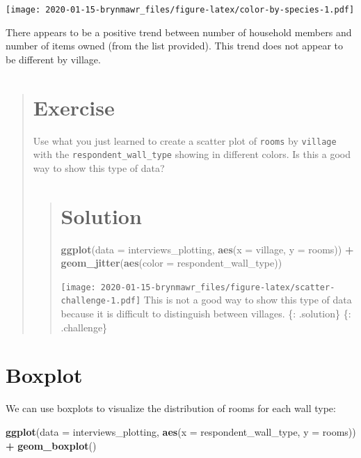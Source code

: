 \documentclass[]{book}
\newenvironment{Shaded}{\begin{snugshade}}{\end{snugshade}}
\newcommand{\KeywordTok}[1]{\textcolor[rgb]{0.13,0.29,0.53}{\textbf{#1}}}
\newcommand{\DataTypeTok}[1]{\textcolor[rgb]{0.13,0.29,0.53}{#1}}
\newcommand{\StringTok}[1]{\textcolor[rgb]{0.31,0.60,0.02}{#1}}
\newcommand{\OperatorTok}[1]{\textcolor[rgb]{0.81,0.36,0.00}{\textbf{#1}}}
\newcommand{\NormalTok}[1]{#1}
\begin{document}
\texttt{[image: 2020-01-15-brynmawr\_files/figure-latex/color-by-species-1.pdf]}

There appears to be a positive trend between number of household members
and number of items owned (from the list provided). This trend does not
appear to be different by village.

\begin{quote}
\section{Exercise}\label{exercise-12}

Use what you just learned to create a scatter plot of \texttt{rooms} by
\texttt{village} with the \texttt{respondent\_wall\_type} showing in
different colors. Is this a good way to show this type of data?

\begin{quote}
\section{Solution}\label{solution-16}

\begin{Shaded}
\begin{Highlighting}[]
\KeywordTok{ggplot}\NormalTok{(}\DataTypeTok{data =}\NormalTok{ interviews_plotting, }\KeywordTok{aes}\NormalTok{(}\DataTypeTok{x =}\NormalTok{ village, }\DataTypeTok{y =}\NormalTok{ rooms)) }\OperatorTok{+}
\KeywordTok{geom_jitter}\NormalTok{(}\KeywordTok{aes}\NormalTok{(}\DataTypeTok{color =}\NormalTok{ respondent_wall_type))}
\end{Highlighting}
\end{Shaded}

\texttt{[image: 2020-01-15-brynmawr\_files/figure-latex/scatter-challenge-1.pdf]}
This is not a good way to show this type of data because it is difficult
to distinguish between villages. \{: .solution\} \{: .challenge\}
\end{quote}
\end{quote}

\section{Boxplot}\label{boxplot}

We can use boxplots to visualize the distribution of rooms for each wall
type:

\begin{Shaded}
\begin{Highlighting}[]
\KeywordTok{ggplot}\NormalTok{(}\DataTypeTok{data =}\NormalTok{ interviews_plotting, }\KeywordTok{aes}\NormalTok{(}\DataTypeTok{x =}\NormalTok{ respondent_wall_type, }\DataTypeTok{y =}\NormalTok{ rooms)) }\OperatorTok{+}
\StringTok{    }\KeywordTok{geom_boxplot}\NormalTok{()}
\end{Highlighting}
\end{Shaded}
\end{document}
